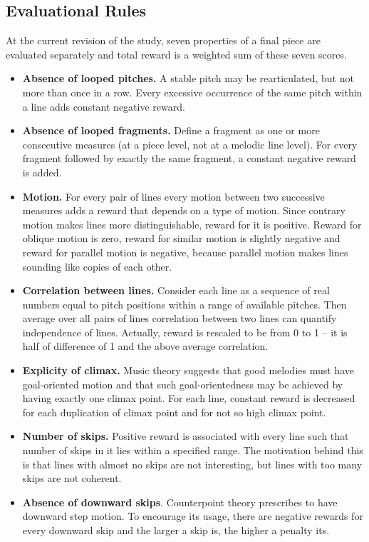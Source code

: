\documentclass{article}
\begin{document}
\subsection{Evaluational Rules}
\label{subsec:setup}

At the current revision of the study, seven properties of a final piece are evaluated separately and total reward is a weighted sum of these seven scores.

\begin{itemize}
	\item \textbf{Absence of looped pitches.} A stable pitch may be rearticulated, but not more than once in a row. Every excessive occurrence of the same pitch within a line adds constant negative reward.
    \item \textbf{Absence of looped fragments.} Define a fragment as one or more consecutive measures (at a piece level, not at a melodic line level). For every fragment followed by exactly the same fragment, a constant negative reward is added.
	\item \textbf{Motion.} For every pair of lines every motion between two successive measures adds a reward that depends on a type of motion. Since contrary motion makes lines more distinguishable, reward for it is positive. Reward for oblique motion is zero, reward for similar motion is slightly negative and reward for parallel motion is negative, because parallel motion makes lines sounding like copies of each other.
	\item \textbf{Correlation between lines.} Consider each line as a sequence of real numbers equal to pitch positions within a range of available pitches. Then average over all pairs of lines correlation between two lines can quantify independence of lines. Actually, reward is rescaled to be from 0 to 1 -- it is half of difference of 1 and the above average correlation.
    \item \textbf{Explicity of climax.} Music theory suggests that good melodies must have goal-oriented motion and that such goal-orientedness may be achieved by having exactly one climax point. For each line, constant reward is decreased for each duplication of climax point and for not so high climax point.
    \item \textbf{Number of skips.} Positive reward is associated with every line such that number of skips in it lies within a specified range. The motivation behind this is that lines with almost no skips are not interesting, but lines with too many skips are not coherent.
    \item \textbf{Absence of downward skips}. Counterpoint theory prescribes to have downward step motion. To encourage its usage, there are negative rewards for every downward skip and the larger a skip is, the higher a penalty its.
\end{itemize}
\end{document}
